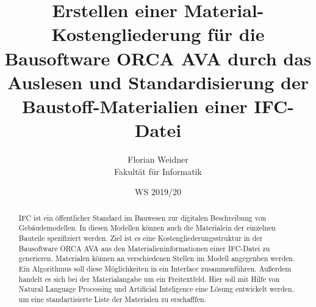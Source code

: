 \documentclass[twoside=true, %
    DIV=15
    ,%
    BCOR=15mm, %
    headinclude=true,
    footinclude=false,
    pagesize,%
    fontsize=11pt,%
    paper=a4,%
    numbers=noenddot
  ]{scrartcl}
\begin{document}
\def\figdir{figures}
\def\tabledir{tables}

\titlehead{
\raggedleft
\texttt{[image: \\figdir/logo-th-rosenheim-2019\_master\_quer\_2c.eps]}
}

\title{
\vspace*{0cm}
Erstellen einer Material-Kostengliederung für die Bausoftware ORCA AVA durch das Auslesen und Standardisierung der Baustoff-Materialien einer IFC-Datei
}

\author{
Florian Weidner\\
Fakultät für Informatik}

\date{WS 2019/20}

\maketitle

\begin{abstract}
IFC ist ein öffentlicher Standard im Bauwesen zur digitalen Beschreibung von Gebäudemodellen. In diesen Modellen können auch die Materialein der einzelnen Bauteile spezifiziert werden. Ziel ist es eine Kostengliederungsstruktur in der Bausoftware ORCA AVA aus den Materialieninformationen einer IFC-Datei zu generieren. Materialen können an verschiedenen Stellen im Modell angegenben werden. Ein Algorithmus soll diese Möglichkeiten in ein Interface zusammenführen. Außerdem handelt es sich bei der Materialangabe um ein Freitextfeld. Hier soll mit Hilfe von Natural Language Processing und Artificial Inteligence eine Lösung entwickelt werden, um eine standartisierte Liste der Materialen zu erschafffen.
\end{abstract}
\pagebreak
\tableofcontents










\appendix





\end{document}
